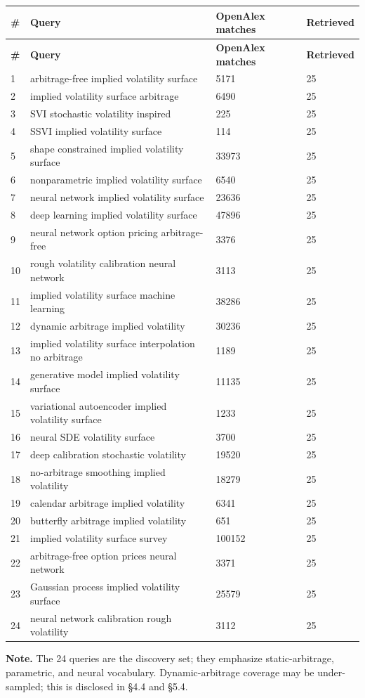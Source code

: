 \documentclass[11pt]{article}
\begin{document}
\begingroup
\begin{longtable}{@{}p{}p{}p{}p{}@{}}
\toprule
\textbf{\#} & \textbf{Query} & \textbf{OpenAlex matches} & \textbf{Retrieved} \\
\midrule
\endfirsthead
\toprule
\textbf{\#} & \textbf{Query} & \textbf{OpenAlex matches} & \textbf{Retrieved} \\
\midrule
\endhead
1 & arbitrage-free implied volatility surface & 5171 & 25 \\
2 & implied volatility surface arbitrage & 6490 & 25 \\
3 & SVI stochastic volatility inspired & 225 & 25 \\
4 & SSVI implied volatility surface & 114 & 25 \\
5 & shape constrained implied volatility surface & 33973 & 25 \\
6 & nonparametric implied volatility surface & 6540 & 25 \\
7 & neural network implied volatility surface & 23636 & 25 \\
8 & deep learning implied volatility surface & 47896 & 25 \\
9 & neural network option pricing arbitrage-free & 3376 & 25 \\
10 & rough volatility calibration neural network & 3113 & 25 \\
11 & implied volatility surface machine learning & 38286 & 25 \\
12 & dynamic arbitrage implied volatility & 30236 & 25 \\
13 & implied volatility surface interpolation no arbitrage & 1189 & 25 \\
14 & generative model implied volatility surface & 11135 & 25 \\
15 & variational autoencoder implied volatility surface & 1233 & 25 \\
16 & neural SDE volatility surface & 3700 & 25 \\
17 & deep calibration stochastic volatility & 19520 & 25 \\
18 & no-arbitrage smoothing implied volatility & 18279 & 25 \\
19 & calendar arbitrage implied volatility & 6341 & 25 \\
20 & butterfly arbitrage implied volatility & 651 & 25 \\
21 & implied volatility surface survey & 100152 & 25 \\
22 & arbitrage-free option prices neural network & 3371 & 25 \\
23 & Gaussian process implied volatility surface & 25579 & 25 \\
24 & neural network calibration rough volatility & 3112 & 25 \\
\bottomrule
\end{longtable}
\endgroup

\textbf{Note.} The 24 queries are the discovery set; they emphasize static-arbitrage, parametric, and neural vocabulary. Dynamic-arbitrage coverage may be under-sampled; this is disclosed in \S 4.4 and \S 5.4.
\end{document}
